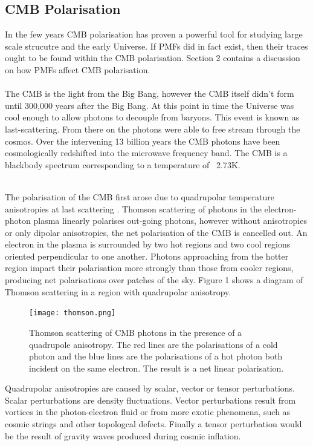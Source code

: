 \subsection{CMB Polarisation}
In the few years CMB polarisation has proven a powerful tool for studying large scale strucutre and the early Universe. If PMFs did in fact exist, then their traces ought to be found within the CMB polarisation. Section 2 contains a discussion on how PMFs affect CMB polarisation.
\\\\
The CMB is the light from the Big Bang, however the CMB itself didn't form until 300,000 years after the Big Bang. At this point in time the Universe was cool enough to allow photons to decouple from baryons. This event is known as last-scattering. From there on the photons were able to free stream through the cosmos. Over the intervening 13 billion years the CMB photons have been cosmologically redshifted into the microwave frequency band. The CMB is a blackbody spectrum corresponding to a temperature of ~2.73K.

\\The polarisation of the CMB first arose due to quadrupolar temperature anisotropies at last scattering \cite{Hu:1997hv}. Thomson scattering of photons in the electron-photon plasma linearly polarises out-going photons, however without anisotropies or only dipolar anisotropies, the net polarisation of the CMB is cancelled out. An electron in the plasma is surrounded by two hot regions and two cool regions oriented perpendicular to one another. Photons approaching from the hotter region impart their polarisation more strongly than those from cooler regions, producing net polarisations over patches of the sky. Figure 1 shows a diagram of Thomson scattering in a region with quadrupolar anisotropy.

\begin{figure}[h]
\centering
\texttt{[image: thomson.png]}
\caption{Thomson scattering of CMB photons in the presence of a quadrupole anisotropy. The red lines are the polarisations of a cold photon and the blue lines are the polarisations of a hot photon both incident on the same electron. The result is a net linear polarisation.}
\label{fig:thomson}
\end{figure}

Quadrupolar anisotropies are caused by scalar, vector or tensor perturbations. Scalar perturbations are density fluctuations. Vector perturbations result from vortices in the photon-electron fluid or from more exotic phenomena, such as cosmic strings and other topologcal defects. Finally a tensor perturbation would be the result of gravity waves produced during cosmic inflation.  

